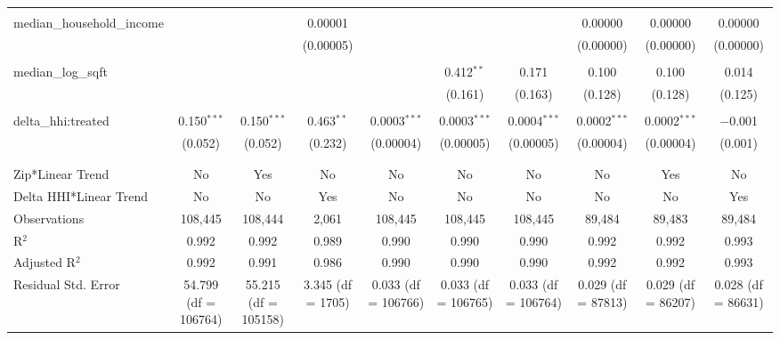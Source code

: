 \begin{table}[H]
{\begin{tabular}{@{\extracolsep{5pt}}lccccccccc}
   & & & & & & & & & \\  

  median\_household\_income &  &  & 0.00001 &  &  &  & 0.00000 & 0.00000 & 0.00000 \\  

   &  &  & (0.00005) &  &  &  & (0.00000) & (0.00000) & (0.00000) \\  

   & & & & & & & & & \\  

  median\_log\_sqft &  &  &  &  & 0.412$^{**}$ & 0.171 & 0.100 & 0.100 & 0.014 \\  

   &  &  &  &  & (0.161) & (0.163) & (0.128) & (0.128) & (0.125) \\  

   & & & & & & & & & \\  

  delta\_hhi:treated & 0.150$^{***}$ & 0.150$^{***}$ & 0.463$^{**}$ & 0.0003$^{***}$ & 0.0003$^{***}$ & 0.0004$^{***}$ & 0.0002$^{***}$ & 0.0002$^{***}$ & $-$0.001 \\  

   & (0.052) & (0.052) & (0.232) & (0.00004) & (0.00005) & (0.00005) & (0.00004) & (0.00004) & (0.001) \\  

   & & & & & & & & & \\  

 \hline \\[-1.8ex]  

 Zip*Linear Trend & No & Yes & No & No & No & No & No & Yes & No \\  

 Delta HHI*Linear Trend & No & No & Yes & No & No & No & No & No & Yes \\  

 Observations & 108,445 & 108,444 & 2,061 & 108,445 & 108,445 & 108,445 & 89,484 & 89,483 & 89,484 \\  

 R$^{2}$ & 0.992 & 0.992 & 0.989 & 0.990 & 0.990 & 0.990 & 0.992 & 0.992 & 0.993 \\  

 Adjusted R$^{2}$ & 0.992 & 0.991 & 0.986 & 0.990 & 0.990 & 0.990 & 0.992 & 0.992 & 0.993 \\  

 Residual Std. Error & 54.799 (df = 106764) & 55.215 (df = 105158) & 3.345 (df = 1705) & 0.033 (df = 106766) & 0.033 (df = 106765) & 0.033 (df = 106764) & 0.029 (df = 87813) & 0.029 (df = 86207) & 0.028 (df = 86631) \\  


\end{tabular}}
\end{table}
